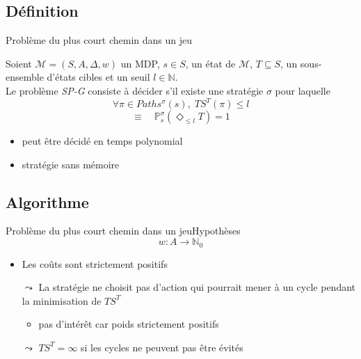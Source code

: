 \documentclass[compress]{beamer}
\theoremstyle{theorem}%
\begin{document}
\subsection{Définition}
\begin{frame}{Problème du plus court chemin dans un jeu}
  \begin{definition}[SP-G]
    Soient $\mathcal{M} = (S, A, \Delta, w)$ un MDP, $s \in S$, un état de $\mathcal{M}$, $T \subseteq S$, un sous-ensemble d'états cibles et un seuil $l \in \mathbb{N}$. \\
    Le problème \textit{\color{fibeamer@orange}SP-G} consiste à décider s'il existe une stratégie $\sigma$ pour laquelle
    \[
      \forall \pi \in Paths^\sigma(s), \; TS^T(\pi) \leq l
    \]
    \[
      \equiv \quad \mathbb{P}_s^\sigma(\Diamond_{\leq l} T) = 1
    \]
  \end{definition}
  \begin{itemize}
    \item peut être décidé en temps polynomial
    \item stratégie sans mémoire
  \end{itemize}
\end{frame}

\subsection{Algorithme}
\begin{frame}{Problème du plus court chemin dans un jeu}{Hypothèses}
\[ w : A \rightarrow \mathbb{N}_0 \]
  \begin{itemize}
    \item Les coûts sont strictement positifs
    \item[$\leadsto$] La stratégie ne choisit pas d'action qui pourrait mener à un cycle pendant la minimisation de $TS^T$
    \begin{itemize}
      \item pas d'intérêt car poids strictement positifs
    \end{itemize}
    \item[$\leadsto$] \alert{$TS^T = \infty$ si les cycles ne peuvent pas être évités}
  \end{itemize}
\end{frame}
\end{document}
